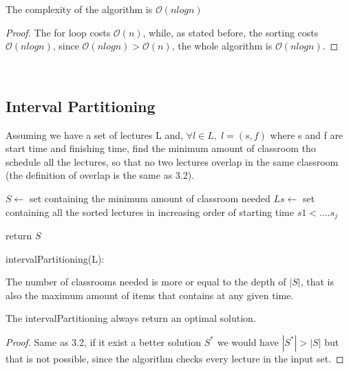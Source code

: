 \begin{claim}
    The complexity of the algorithm is $\mathcal{O}{(nlogn)}$
\end{claim}
\begin{proof}
    The for loop costs $\mathcal{O}{(n)}$, while, as stated before, the sorting costs $\mathcal{O}{(nlogn)}$, since $\mathcal{O}{(nlogn)} > \mathcal{O}{(n)}$, the whole algorithm is $\mathcal{O}{(nlogn)}.$
\end{proof}\\

\subsection{Interval Partitioning}
Assuming we have a set of lectures L and, $\forall l \in L ,\; l=(s,f)$ where s and f are start time and finishing time, find the minimum amount of classroom tho schedule all the lectures, so that no two lectures overlap in the same classroom (the definition of overlap is the same as 3.2).

\begin{algorithm}[H]
    \SetAlgoLined
    \small
    \BlankLine

    $S \leftarrow$ set containing the minimum amount of classroom needed\;
    $Ls \leftarrow$ set containing all the sorted lectures in increasing order of starting time $s1 < .... s_{j}$

    \BlankLine

    \BlankLine

    return $S$\;
    \caption{intervalPartitioning(L):}
\end{algorithm}

The number of classrooms needed is more or equal to the depth of $|S|$, that is also the maximum amount of items that contains at any given time.	\\

\begin{claim}
    The intervalPartitioning always return an optimal solution.
\end{claim}
\begin{proof}
    Same as 3.2, if it exist a better solution $S^{*}$ we would have $|S^{*}| > |S|$ but that is not possible, since the algorithm checks every lecture in the input set.
\end{proof}\\

